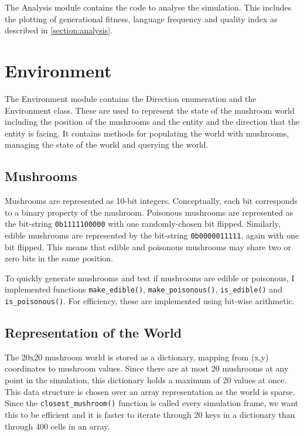 \documentclass[12pt,a4paper,twoside,openright]{report}
\begin{document}
The Analysis module contains the code to analyse the simulation. This includes the plotting of generational fitness, language frequency and quality index as described in \ref{section:analysis}.

\section{Environment}\label{section:impl-env}

The Environment module contains the Direction enumeration and the Environment class. These are used to represent the state of the mushroom world including the position of the mushrooms and the entity and the direction that the entity is facing. It contains methods for populating the world with mushrooms, managing the state of the world and querying the world.

\subsection{Mushrooms}\label{section:mushrooms}

Mushrooms are represented as 10-bit integers. Conceptually, each bit corresponds to a binary property of the mushroom. Poisonous mushrooms are represented as the bit-string \verb!0b1111100000! with one randomly-chosen bit flipped. Similarly, edible mushrooms are represented by the bit-string \verb~0b0000011111~, again with one bit flipped. This means that edible and poisonous mushrooms may share two or zero bits in the same position.

To quickly generate mushrooms and test if mushrooms are edible or poisonous, I implemented functions \texttt{make\_edible()}, \texttt{make\_poisonous()}, \texttt{is\_edible()} and \texttt{is\_poisonous()}. For efficiency, these are implemented using bit-wise arithmetic.

\subsection{Representation of the World}

The 20x20 mushroom world is stored as a dictionary, mapping from (x,y) coordinates to mushroom values. Since there are at most 20 mushrooms at any point in the simulation, this dictionary holds a maximum of 20 values at once. This data structure is chosen over an array representation as the world is sparse. Since the \texttt{closest\_mushroom()} function is called every simulation frame, we want this to be efficient and it is faster to iterate through 20 keys in a dictionary than through 400 cells in an array. 
\end{document}
